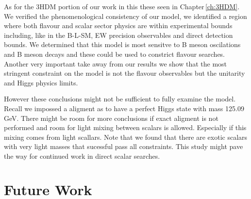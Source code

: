 As for the 3HDM portion of our work in this these seen in  Chapter\,\ref{ch:3HDM}. 
%
We verified the phenomenological consistency of our model, we identified a region where both flavour and scalar sector physics are within experimental bounds including, like in the B-L-SM, EW precision observables and direct detection bounds.  
%
%
We determined that this model is most sensitve to B meson oscilations and B meson decays and these could be used to constrict flavour searches. 
%
Another very important take away from our results we show that the most stringent constraint on the model is not the flavour observables but the unitarity and Higgs physics limits.  

However these conclusions might not be sufficient to fully examine the model. Recall we impossed a aligment as to have a perfect Higgs state with mass 125.09 GeV. There might be room for more conclusions if exact aligment is not performed and room for light mixing between scalars is allowed. 
%
Especially if this mixing comes from light scallars. 
%
Note that we found that there are exotic scalars with very light masses that sucessful pass all constraints. 
% 
This study might pave the way for continued work in direct scalar searches. 


%
%
%
%

\section{ Future Work}

